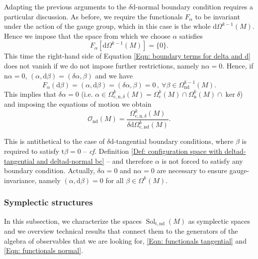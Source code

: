 Adapting the previous arguments to the $\delta\mathrm{d}$-normal boundary condition requires a particular discussion. As before, we require the functionals $F_\alpha$ to be invariant under the action of the gauge group, which in this case is the whole $\mathrm{d}\Omega^{k-1}(M)$. Hence we impose that the space from which we choose $\alpha$ satisfies
\begin{equation*}
F_\alpha\left[\mathrm{d}\Omega^{k-1}(M)\right]=\{0\}.
\end{equation*}
This time the right-hand side of Equation \eqref{Eqn: boundary terms for delta and d} does not vanish if we do not impose further restrictions, namely $\mathrm{n}\alpha=0$. Hence, if $\mathrm{n}\alpha=0$, $(\alpha,\mathrm{d}\beta)=(\delta\alpha,\beta)$ and we have
\[	F_\alpha(\mathrm{d}\beta)	=(\alpha,\mathrm{d}\beta)=(\delta\alpha,\beta)=0\,,\ \forall \beta\in\Omega_{\mathrm{nd}}^{k-1}(M).	\]
This implies that $\delta\alpha=0$ (i.e. $\alpha\in\Omega_{\mathrm{c,n},\delta}^k(M)=\Omega_{\mathrm{c}}^k(M)\cap \Omega_{\mathrm{n}}^k(M)\cap\ker\delta$) and imposing the equations of motion we obtain
\begin{equation}\label{Eqn: functionals normal}
\mathcal{O}_{\mathrm{nd}}(M)=\frac{\Omega_{\mathrm{c,n},\delta}^k(M)}{\delta\mathrm{d}\Omega_{\mathrm{c,nd}}^k(M)}.
\end{equation}


This is antithetical to the case of $\delta\mathrm{d}$-tangential boundary conditions, where $\beta$ is required to satisfy $\mathrm{t}\beta=0$ -- \textit{cf.} Definition \ref{Def: configuration space with deltad-tangential and deltad-normal bc} -- and therefore $\alpha$ is not forced to satisfy any boundary condition.
Actually, $\delta\alpha=0$ and $\mathrm{n}\alpha=0$ are necessary to ensure gauge-invariance, namely $(\alpha,\mathrm{d}\beta)=0$ for all $\beta\in\Omega^k(M)$.

\subsubsection{Symplectic structures}\label{Sub: symplectic structures}

In this subsection, we characterize the spaces $\operatorname{Sol}_{\mathrm{t,nd}}(M)$ as symplectic spaces and we overview technical results that connect them to the generators of the algebra of observables that we are looking for, \eqref{Eqn: functionals tangential} and \eqref{Eqn: functionals normal}.\\


